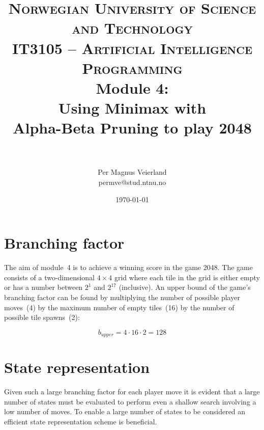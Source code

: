 

\usepackage{float}

\title{	
\normalfont \normalsize 
\textsc{Norwegian University of Science and Technology\\IT3105 -- Artificial Intelligence Programming}
\horrule{0.5pt} \\[0.4cm]
\huge Module 4:\\ Using Minimax with\\ Alpha-Beta Pruning to play 2048\\
\horrule{2pt} \\[0.5cm]
}

\author{Per Magnus Veierland\\permve@stud.ntnu.no}

\date{\normalsize\today}



\maketitle

\section*{Branching factor}

The aim of module~4 is to achieve a winning score in the game \textsc{2048}. The game consists of a two-dimensional $4\times 4$ grid where each tile in the grid is either empty or has a number between $2^1$ and $2^{17}$ (inclusive). An upper bound of the game's branching factor can be found by multiplying the number of possible player moves~(4) by the maximum number of empty tiles~(16) by the number of possible tile spawns~(2):

\begin{displaymath}
b_{\textit{upper}} = 4 \cdot 16 \cdot 2 = 128
\end{displaymath}

\section*{State representation}

Given such a large branching factor for each player move it is evident that a large number of states must be evaluated to perform even a shallow search involving a low number of moves. To enable a large number of states to be considered an efficient state representation scheme is beneficial.

